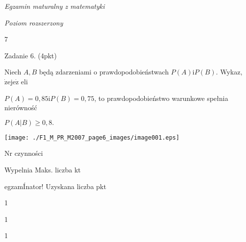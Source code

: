 \documentclass[a4paper,12pt]{article}
\begin{document}
{\it Egzamin maturalny z matematyki}

{\it Poziom rozszerzony}

7

Zadanie 6. (4pkt)

Niech $A, B$ będą zdarzeniami o prawdopodobieństwach $P(A) \mathrm{i} P(B)$. Wykaz, $\dot{\mathrm{z}}\mathrm{e}\mathrm{j}\mathrm{e}\dot{\mathrm{z}}$ eli

$P(A)=0,85 \mathrm{i} P(B)=0,75$, to prawdopodobieństwo warunkowe spełnia nierówność

$P(A|B)\geq 0,8.$
\begin{center}
\texttt{[image: ./F1\_M\_PR\_M2007\_page6\_images/image001.eps]}
\end{center}
Nr czynności

Wypelnia Maks. liczba kt

egzamÍnator! Uzyskana liczba pkt

1

1

1
\end{document}
